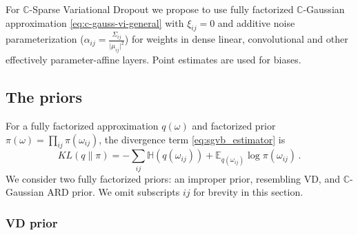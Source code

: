 \documentclass[a4paper,10pt,twocolumn]{article}
\newcommand{\cplx}{\mathbb{C}}
\begin{document}
For $\cplx$-Sparse Variational Dropout we propose to use fully factorized $\cplx$-Gaussian
approximation \eqref{eq:c-gauss-vi-general} with $\xi_{ij} = 0$ and additive noise
parameterization ($
  \alpha_{ij} = \tfrac{\Sigma_{ij}}{\lvert \mu_{ij} \rvert^2}
$) for weights in dense linear, convolutional and other effectively parameter-affine
layers. Point estimates are used for biases.


\subsection{The priors} %
\label{sub:the_priors}

For a fully factorized approximation $q(\omega)$ and factorized prior $
  \pi(\omega) = \prod_{ij} \pi(\omega_{ij})
$, the divergence term \eqref{eq:sgvb_estimator} is
\begin{equation}  \label{eq:elbo-general-kl-div}
  KL(q \| \pi)
    = - \sum_{ij}
        \mathbb{H}(q(\omega_{ij}))
        + \mathbb{E}_{q(\omega_{ij})} \log{\pi(\omega_{ij})}
    \,.
\end{equation}
We consider two fully factorized priors: an improper prior, resembling VD, and $\cplx$-Gaussian
ARD prior. We omit subscripts ${ij}$ for brevity in this section.

\subsubsection{VD prior} %
\label{ssub:vd_prior}
\end{document}
